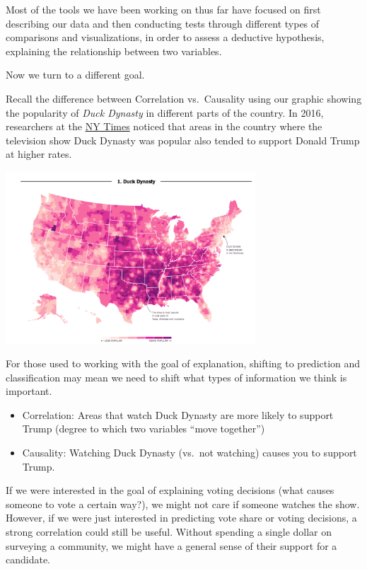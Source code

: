 \documentclass[
  letterpaper,
  DIV=11,
  numbers=noendperiod]{scrreprt}
\providecommand{\tightlist}{%
  \setlength{\itemsep}{0pt}\setlength{\parskip}{0pt}}\usepackage{longtable,booktabs,array}
\begin{document}
Most of the tools we have been working on thus far have focused on first
describing our data and then conducting tests through different types of
comparisons and visualizations, in order to assess a deductive
hypothesis, explaining the relationship between two variables.

Now we turn to a different goal.

Recall the difference between Correlation vs.~Causality using our
graphic showing the popularity of \emph{Duck Dynasty} in different parts
of the country. In 2016, researchers at the
\href{https://www.nytimes.com/interactive/2016/12/26/upshot/duck-dynasty-vs-modern-family-television-maps.html}{NY
Times} noticed that areas in the country where the television show Duck
Dynasty was popular also tended to support Donald Trump at higher rates.

\includegraphics[width=0.7\textwidth,height=\textheight]{images/duckdynasty.png}

For those used to working with the goal of explanation, shifting to
prediction and classification may mean we need to shift what types of
information we think is important.

\begin{itemize}
\tightlist
\item
  Correlation: Areas that watch Duck Dynasty are more likely to support
  Trump (degree to which two variables ``move together'')
\item
  Causality: Watching Duck Dynasty (vs.~not watching) causes you to
  support Trump.
\end{itemize}

If we were interested in the goal of explaining voting decisions (what
causes someone to vote a certain way?), we might not care if someone
watches the show. However, if we were just interested in predicting vote
share or voting decisions, a strong correlation could still be useful.
Without spending a single dollar on surveying a community, we might have
a general sense of their support for a candidate.
\end{document}
